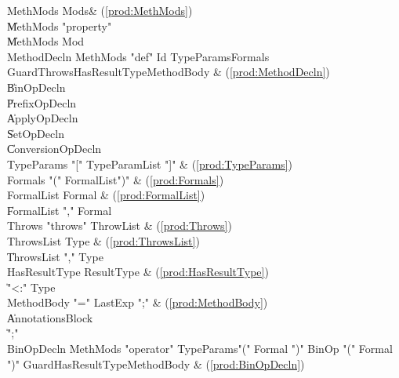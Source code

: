 \begin{bbgrammar}
            MethMods \: Mods\opt & (\ref{prod:MethMods}) \\
                     \| MethMods \xcd"property"  \\
                     \| MethMods Mod \\
         MethodDecln \: MethMods \xcd"def" Id TypeParams\opt Formals Guard\opt Throws\opt HasResultType\opt MethodBody & (\ref{prod:MethodDecln}) \\
                     \| BinOpDecln \\
                     \| PrefixOpDecln \\
                     \| ApplyOpDecln \\
                     \| SetOpDecln \\
                     \| ConversionOpDecln \\
          TypeParams \: \xcd"[" TypeParamList \xcd"]" & (\ref{prod:TypeParams}) \\
             Formals \: \xcd"(" FormalList\opt \xcd")" & (\ref{prod:Formals}) \\
          FormalList \: Formal & (\ref{prod:FormalList}) \\
                     \| FormalList \xcd"," Formal \\
             Throws \: \xcd"throws" ThrowList & (\ref{prod:Throws}) \\
          ThrowsList \: Type & (\ref{prod:ThrowsList}) \\
                     \| ThrowsList \xcd"," Type \\
       HasResultType \: ResultType & (\ref{prod:HasResultType}) \\
                     \| \xcd"<:" Type \\
          MethodBody \: \xcd"=" LastExp \xcd";" & (\ref{prod:MethodBody}) \\
                     \| Annotations\opt Block \\
                     \| \xcd";" \\
          BinOpDecln \: MethMods \xcd"operator" TypeParams\opt \xcd"(" Formal  \xcd")" BinOp \xcd"(" Formal  \xcd")" Guard\opt HasResultType\opt MethodBody & (\ref{prod:BinOpDecln}) \\

\end{bbgrammar}
